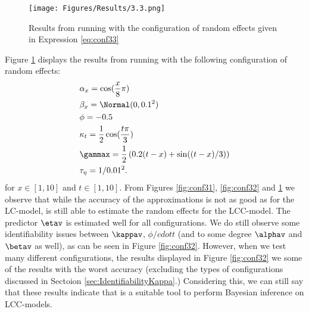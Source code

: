 \begin{figure}[h!]
    \centering
    \texttt{[image: Figures/Results/3.3.png]}
    \caption{Results from running \inlabru with the configuration of random effects given in Expression \ref{eq:conf33}}
    \label{fig:conf33}
\end{figure}
Figure \ref{fig:conf33} displays the results from running \inlabru with the following configuration of random effects:
\begin{equation}
    \begin{aligned}
        &\alpha_x = \cos(\frac{x}{8}\pi)\\
        &\beta_x = \Normal(0,0.1^2)\\
        &\phi = -0.5\\
        &\kappa_t = \frac{1}{2}\cos(\frac{t\pi}{3})\\
        &\gammax = \frac{1}{2}\left( 0.2(t-x) + \sin((t-x)/3)\right)\\
        &\tau_{\eta} = 1/0.01^2.
    \end{aligned}
    \label{eq:conf33}
\end{equation}
for $x\in[1,10]$ and $t \in [1,10]$. 
From Figures \ref{fig:conf31}, \ref{fig:conf32} and \ref{fig:conf33} we observe that while the accuracy of the approximations is not as good as for the LC-model, \inlabru is still able to estimate the random effects for the LCC-model. The predictor $\etav$ is estimated well for all configurations. We do still observe some identifiability issues between $\kappav$, $\phi /cdot t$ (and to some degree $\alphav$ and $\betav$ as well), as can be seen in Figure \ref{fig:conf32}. However, when we test many different configurations, the results displayed in Figure \ref{fig:conf32} we some of the results with the worst accuracy (excluding the types of configurations discussed in Sectoion \ref{sec:IdentifiabilityKappa}.) Considering this, we can still say that these results indicate that \inlabru is a suitable tool to perform Bayesian inference on LCC-models. 
